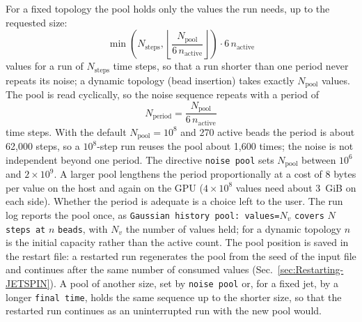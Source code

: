 For a fixed topology the pool holds only the values the run needs, up
to the requested size:
\[
\min\left(N_{\mathrm{steps}},\left\lfloor \frac{N_{\mathrm{pool}}}{6\,n_{\mathrm{active}}}\right\rfloor\right)\cdot6\,n_{\mathrm{active}}
\]
values for a run of $N_{\mathrm{steps}}$ time steps, so that a run
shorter than one period never repeats its noise; a dynamic topology
(bead insertion) takes exactly $N_{\mathrm{pool}}$ values.
The pool is read cyclically, so the noise sequence repeats with a period of
\begin{equation}
N_{\mathrm{period}}=\frac{N_{\mathrm{pool}}}{6\,n_{\mathrm{active}}}
\end{equation}
time steps. With the default $N_{\mathrm{pool}}=10^{8}$ and 270 active beads
the period is about 62,000 steps, so a $10^{8}$-step run reuses the pool about
1,600 times; the noise is not independent beyond one period. The directive
\texttt{noise pool} sets $N_{\mathrm{pool}}$ between $10^{6}$ and
$2\times10^{9}$. A larger pool lengthens the period proportionally at a cost
of 8 bytes per value on the host and again on the GPU ($4\times10^{8}$ values
need about 3~GiB on each side). Whether the period is adequate is a choice
left to the user. The run log reports the pool once, as
\texttt{Gaussian history pool: values=}$N_{v}$ \texttt{covers}
$N$ \texttt{steps at} $n$ \texttt{beads}, with $N_{v}$ the number of
values held; for a dynamic topology $n$ is the
initial capacity rather than the active count. The pool position is saved in the restart
file: a restarted run regenerates the pool from the seed of the input file and
continues after the same number of consumed values
(Sec.~\ref{sec:Restarting-JETSPIN}). A pool of another size, set by
\texttt{noise pool} or, for a fixed jet, by a longer \texttt{final time},
holds the same sequence up to the shorter size, so that the restarted run
continues as an uninterrupted run with the new pool would.
